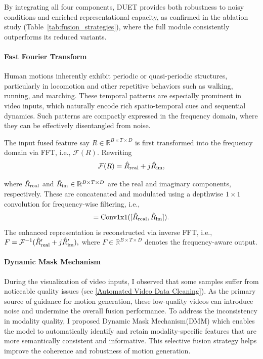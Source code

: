 \documentclass[a4paper,12pt]{article}
\begin{document}
By integrating all four components, DUET provides both robustness to noisy conditions and enriched representational capacity, as confirmed in the ablation study (Table~\ref{tab:fusion_strategies}), where the full module consistently outperforms its reduced variants.


\paragraph{Fast Fourier Transform}
Human motions inherently exhibit periodic or quasi-periodic structures, particularly in locomotion and other repetitive behaviors such as walking, running, and marching. These temporal patterns are especially prominent in video inputs, which naturally encode rich spatio-temporal cues and sequential dynamics. Such patterns are compactly expressed in the frequency domain, where they can be effectively disentangled from noise.

 The input fused feature say $R \in \mathbb{R}^{B \times T \times D}$ is first transformed into the frequency domain via FFT, i.e., $\mathcal{F}(R)$. Rewriting
\begin{equation}
\mathcal{F}(R) = \hat{R}_{\rm real} + j \hat{R}_{\rm im},
\end{equation}

where $\hat{R}_{\rm real}$ and $\hat{R}_{\rm im} \in \mathbb{R}^{B \times T \times D}$ are the real and imaginary components, respectively. These are concatenated and modulated using a depthwise $1 \times 1$ convolution for frequency-wise filtering, i.e.,
\begin{equation}
    [\hat{R}_{\rm real}', \hat{R}_{\rm im}'] = \text{Conv1x1}([\hat{R}_{\rm real}, \hat{R}_{\rm im}]).
\end{equation}
The enhanced representation is reconstructed via inverse FFT, i.e., $ \small F = \mathcal{F}^{-1}(\hat{R}_{\rm real}' + j \hat{R}_{\rm im}'), $ where $F \in \mathbb{R}^{B \times T \times D}$ denotes the frequency-aware output.


\paragraph{Dynamic Mask Mechanism}
During the visualization of video inputs, I observed that some samples suffer from noticeable quality issues (see \ref{Automated Video Data Cleaning}). As the primary source of guidance for motion generation, these low-quality videos can introduce noise and undermine the overall fusion performance. To address the inconsistency in modality quality, I proposed Dynamic Mask Mechanism(DMM) which enables the model to automatically identify and retain modality-specific features that are more semantically consistent and informative. This selective fusion strategy helps improve the coherence and robustness of motion generation.
\end{document}
